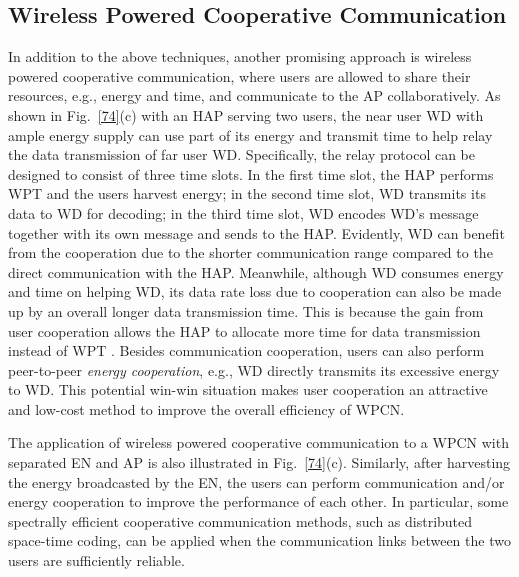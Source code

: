 \documentclass[journal, draftcls, one column, 12pt]{IEEEtran}
\begin{document}
\subsection{Wireless Powered Cooperative Communication}
In addition to the above techniques, another promising approach is wireless powered cooperative communication, where users are allowed to share their resources, e.g., energy and time, and communicate to the AP collaboratively. As shown in Fig.~\ref{74}(c) with an HAP serving two users, the near user WD with ample energy supply can use part of its energy and transmit time to help relay the data transmission of far user WD. Specifically, the relay protocol can be designed to consist of three time slots. In the first time slot, the HAP performs WPT and the users harvest energy; in the second time slot, WD transmits its data to WD for decoding; in the third time slot, WD encodes WD's message together with its own message and sends to the HAP. Evidently, WD can benefit from the cooperation due to the shorter communication range compared to the direct communication with the HAP. Meanwhile, although WD consumes energy and time on helping WD, its data rate loss due to cooperation can also be made up by an overall longer data transmission time. This is because the gain from user cooperation allows the HAP to allocate more time for data transmission instead of WPT \cite{2014:Ju2}. Besides communication cooperation, users can also perform peer-to-peer \emph{energy cooperation}, e.g., WD directly transmits its excessive energy to WD. This potential win-win situation makes user cooperation an attractive and low-cost method to improve the overall efficiency of WPCN.

The application of wireless powered cooperative communication to a WPCN with separated EN and AP is also illustrated in Fig.~\ref{74}(c). Similarly, after harvesting the energy broadcasted by the EN, the users can perform communication and/or energy cooperation to improve the performance of each other. In particular, some spectrally efficient cooperative communication methods, such as distributed space-time coding, can be applied when the communication links between the two users are sufficiently reliable.
\end{document}

